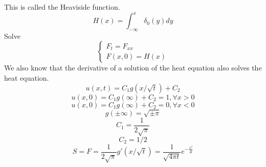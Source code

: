 \documentclass{article}
\begin{document}
This is called the Heaviside function.\\
$$ H(x) = \int_{-\infty}^{x} \delta_0(y) dy$$
Solve 
$$\begin{cases}
    F_t = F_{xx}\\
    F(x,0) = H(x)
\end{cases}$$
We also know that the derivative of a solution of the heat equation also solves the heat equation.
$$ u(x,t) = C_1 g(x/\sqrt{t}) + C_2$$
$$ u(x,0) = C_1 g(\infty) + C_2 = 1, \forall x >0$$
$$ u(x,0) = C_1 g(\infty) + C_2 = 0, \forall x < 0$$
$$ g(\pm \infty) = \sqrt{\pm \pi}$$
$$ C_1 = \frac{1}{2\sqrt{\pi}}$$
$$ C_2 = 1/2$$
$$ S = F = \frac{1}{2\sqrt{\pi}} g'(x/\sqrt{t})= \frac{1}{\sqrt{4\pi t}} e^{-\frac{x^2}{4t}}$$

\end{document}
